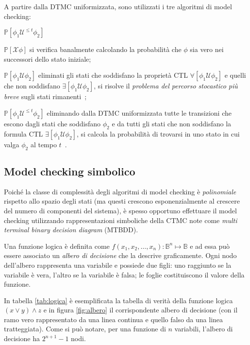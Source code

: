 	A partire dalla DTMC uniformizzata, sono utilizzati i tre algoritmi di model checking:
	\begin{labeling}{$\mathbb{P}{[\phi_1 \mathcal{U}^{\leq t} \phi_2]}$}
		\item [$\mathbb{P}{[\mathcal{X}\phi]}$] si verifica banalmente calcolando la probabilit\`a che $\phi$ sia vero nei successori dello stato iniziale;
		\item [$\mathbb{P}{[\phi_1 \mathcal{U} \phi_2]}$] eliminati gli stati che soddisfano la propriet\`a CTL $\forall[\phi_1 \mathcal{U} \phi_2]$ e quelli che non soddisfano $\exists[\phi_1 \mathcal{U} \phi_2]$, si risolve il \emph{problema del percorso stocastico pi\`u breve} sugli stati rimanenti~\cite{probabilistic};
		\item [$\mathbb{P}{[\phi_1 \mathcal{U}^{\leq t} \phi_2]}$] eliminando dalla DTMC uniformizzata tutte le transizioni che escono dagli stati che soddisfano $\phi_2$ e da tutti gli stati che non soddisfano la formula CTL $\exists [\phi_1 \mathcal{U} \phi_2]$, si calcola la probabilit\`a di trovarsi in uno stato in cui valga $\phi_2$ al tempo $t$~\cite{parker2003implementation}.
	\end{labeling}

	\subsection{Model checking simbolico}\label{sez:mtbdd}
	Poich\'e la classe di complessit\`a degli algoritmi di model checking \`e \emph{polinomiale} rispetto allo spazio degli stati (ma questi crescono esponenzialmente al crescere del numero di componenti del sistema), \`e spesso opportuno effettuare il model checking utilizzando rappresentazioni simboliche della CTMC note come \emph{multi terminal binary decision diagram} (MTBDD).
	
	Una funzione logica \`e definita come $f(x_1, x_2, \dots, x_n): \mathbb{B}^n \mapsto \mathbb{B}$ e ad essa pu\`o essere associato un \emph{albero di decisione} che la descrive graficamente.
	Ogni nodo dell'albero rappresenta una variabile e possiede due figli: uno raggiunto se la variabile \`e vera, l'altro se la variabile \`e falsa; le foglie costituiscono il valore della funzione.
	
	In tabella \ref{tab:logica} \`e esemplificata la tabella di verit\`a della funzione logica $(x \vee y) \wedge z$ e in figura \ref{fig:albero} il corrispondente albero di decisione (con il ramo vero rappresentato da una linea continua e quello falso da una linea tratteggiata).
	Come si pu\`o notare, per una funzione di $n$ variabili, l'albero di decisione ha $2^{n+1} - 1$ nodi.
	
